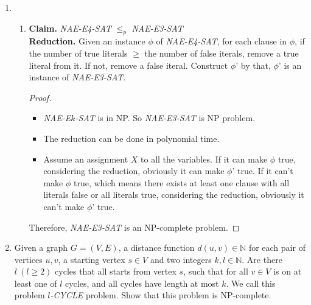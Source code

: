 \documentclass[12pt,a4paper]{article}
\makeatletter
\newtheorem*{solution}{Solution}
\theoremstyle{definition}
\renewenvironment{solution}[1][Solution] {\par\pushQED{\qed}\normalfont\topsep6\p@\@plus6\p@\relax\trivlist\item[\hskip\labelsep\bfseries#1\@addpunct{.}]\ignorespaces}{\popQED\endtrivlist\@endpefalse} \makeatother
\makeatother
\begin{document}
\begin{enumerate}
\begin{solution}
\begin{enumerate}
    	\item \textbf{Claim.} \textit{NAE-E4-SAT} $\leq _p$ \textit{NAE-E3-SAT} \\
    	\textbf{Reduction.} Given an instance $\phi$ of \textit{NAE-E4-SAT}, for each clause in $\phi$, if the number of true literals $\geq$ the number of false iterals, remove a true literal from it. If not, remove a false iteral. Construct $\phi$' by that, $\phi$' is an instance of \textit{NAE-E3-SAT}.
    	\begin{proof}
    		\begin{itemize}
    			\item \textit{NAE-E$k$-SAT} is in NP. So \textit{NAE-E3-SAT} is NP problem.
    			\item The reduction can be done in polynomial time. 
    			\item Assume an assignment $X$ to all the variables. If it can make $\phi$ true, considering the reduction, obviously it can make $\phi$' true. If it can't make $\phi$ true, which means there exists at least one clause with all literals false or all literals true, considering the reduction, obviously it can't make $\phi$' true. 
    		\end{itemize}
    		Therefore, \textit{NAE-E3-SAT} is an NP-complete problem. 
    	\end{proof}
    \end{enumerate} 
    \end{solution}	

	\item Given a graph $G = (V,E)$, a distance function $d(u,v)\in \mathbb{N}$ for each pair of vertices $u,v$, a starting vertex $s\in V$ and two integers $k, l \in \mathbb{N}$. Are there $l\ (l\ge 2)$ cycles that all starts from vertex $s$, such that for all $v\in V$ is on at least one of $l$ cycles, and all cycles have length at most $k$. We call this problem \textit{$l$-CYCLE} problem. Show that this problem is NP-complete.
	

\end{enumerate}
\end{document}
